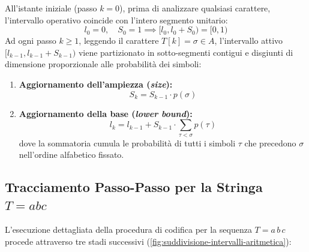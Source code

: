 All'istante iniziale (passo $k = 0$), prima di analizzare qualsiasi carattere, l'intervallo operativo coincide con l'intero segmento unitario:
\begin{equation}
  l_0 = 0, \quad S_0 = 1 \implies [l_0, l_0 + S_0) = [0, 1)
\end{equation}
Ad ogni passo $k \ge 1$, leggendo il carattere $T[k] = \sigma \in A$, l'intervallo attivo $[l_{k-1}, l_{k-1} + S_{k-1})$ viene partizionato in sotto-segmenti contigui e disgiunti di dimensione proporzionale alle probabilit\`a dei simboli:
\begin{enumerate}
  \item \textbf{Aggiornamento dell'ampiezza (\textit{size}):}
  \begin{equation}
    S_k = S_{k-1} \cdot p(\sigma)
  \end{equation}
  \item \textbf{Aggiornamento della base (\textit{lower bound}):}
  \begin{equation}
    l_k = l_{k-1} + S_{k-1} \cdot \sum_{\tau < \sigma} p(\tau)
  \end{equation}
  dove la sommatoria cumula le probabilit\`a di tutti i simboli $\tau$ che precedono $\sigma$ nell'ordine alfabetico fissato.
\end{enumerate}

\FloatBarrier
\subsection{Tracciamento Passo-Passo per la Stringa $T = abc$}
\label{subsec:tracciamento-passo-passo-abc}

L'esecuzione dettagliata della procedura di codifica per la sequenza $T = a\,b\,c$ procede attraverso tre stadi successivi (\autoref{fig:suddivisione-intervalli-aritmetica}):

